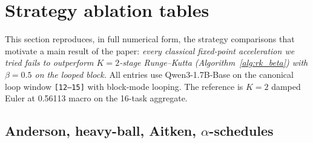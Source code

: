 \section{Strategy ablation tables}
\label{app:strategy-ablation}

This section reproduces, in full numerical form, the strategy comparisons that motivate a main result of the paper: \emph{every classical fixed-point acceleration we tried fails to outperform $K{=}2$-stage Runge--Kutta (Algorithm~\ref{alg:rk_beta}) with $\beta{=}0.5$ on the looped block.} All entries use Qwen3-1.7B-Base on the canonical loop window \texttt{[12--15]} with block-mode looping. The reference is $K{=}2$ damped Euler at 0.56113 macro on the 16-task aggregate.

\subsection{Anderson, heavy-ball, Aitken, \texorpdfstring{$\alpha$}{alpha}-schedules}

